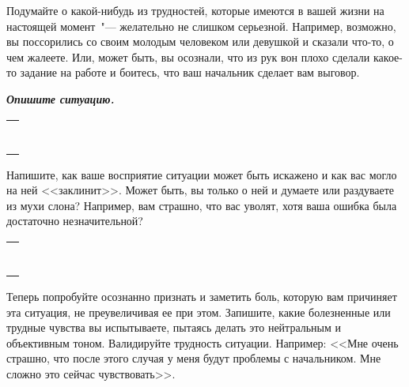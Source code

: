 \newpage
{}
\begin{itemize}
	\itemWritingHand Подумайте о какой-нибудь из трудностей, которые имеются в вашей жизни на настоящей момент~"--- желательно не слишком серьезной. Например, возможно, вы поссорились со своим молодым человеком или девушкой и сказали что-то, о чем жалеете. Или, может быть, вы осознали, что из рук вон плохо сделали какое-то задание на работе и боитесь, что ваш начальник сделает вам выговор.
	
	\textbf{\textit{Опишите ситуацию.}}
\end{itemize}

\setlength{\extrarowheight}{2mm}
\begin{tabularx}{\textwidth}{X}
	\\
	\arrayrulecolor{gray}\hline\\
	\hline\\
	\hline\\
	\hline\\
	\hline\\
	\hline\\
	\hline\\
	\hline\\	
\end{tabularx}
\setlength{\extrarowheight}{0mm}

\begin{itemize}
	\itemWritingHand Напишите, как ваше восприятие ситуации может быть искажено и как вас могло на ней <<заклинит>>. Может быть, вы только о ней и думаете или раздуваете из мухи слона? Например, вам страшно, что вас уволят, хотя ваша ошибка была достаточно незначительной?
\end{itemize}

\setlength{\extrarowheight}{2mm}
\begin{tabularx}{\textwidth}{X}
	\\
	\arrayrulecolor{gray}\hline\\
	\hline\\
	\hline\\
	\hline\\
	\hline\\
	\hline\\
	\hline\\
	\hline\\	
\end{tabularx}
\setlength{\extrarowheight}{0mm}

\begin{itemize}
	\itemWritingHand Теперь попробуйте осознанно признать и заметить боль, которую вам причиняет эта ситуация, не преувеличивая ее при этом. Запишите, какие болезненные или трудные чувства вы испытываете, пытаясь делать это нейтральным и объективным тоном. Валидируйте трудность ситуации. Например: <<Мне очень страшно, что после этого случая у меня будут проблемы с начальником.  Мне сложно это сейчас чувствовать>>.
\end{itemize}

